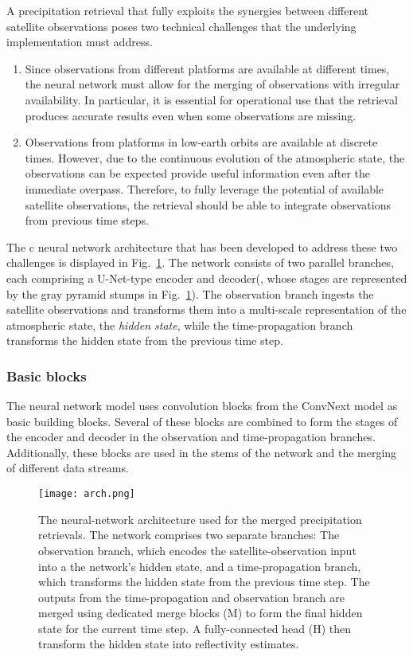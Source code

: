 \documentclass[11pt]{scrartcl}
\begin{document}
A precipitation retrieval that fully exploits the synergies between different
satellite observations poses two technical challenges that the underlying
implementation must address.
\begin{enumerate}
\item Since observations from different platforms are available at different
  times, the neural network must allow for the merging of observations with
  irregular availability. In particular, it is essential for operational use
  that the retrieval produces accurate results even when some observations are
  missing.

\item Observations from platforms in low-earth orbits are available at discrete
  times. However, due to the continuous evolution of the atmospheric state, the
  observations can be expected provide useful information even after the immediate
  overpass. Therefore, to fully leverage the potential of available satellite
  observations, the retrieval should be able to integrate observations from
  previous time steps.
\end{enumerate}


The c neural network architecture that has been developed to address these two
challenges is displayed in Fig.~\ref{fig:arch}. The network consists of two
parallel branches, each comprising a U-Net-type \citep{ronneberger15} encoder
and decoder(, whose stages are represented by the gray pyramid stumps in
Fig.~\ref{fig:arch}). The observation branch ingests the satellite observations
and transforms them into a multi-scale representation of the atmospheric state,
the \textit{hidden state}, while the time-propagation branch transforms the
hidden state from the previous time step.


\subsubsection{Basic blocks}

The neural network model uses convolution blocks from the ConvNext \citep{liu22}
model as basic building blocks. Several of these blocks are combined to form the
stages of the encoder and decoder in the observation and time-propagation
branches. Additionally, these blocks are used in the stems of the network and
the merging of different data streams.

\begin{figure}
\begin{center}
  \texttt{[image: arch.png]}
  \caption{
    The neural-network architecture used for the merged precipitation
    retrievals. The network comprises two separate branches: The observation
    branch, which encodes the satellite-observation input into a the network's
    hidden state, and a time-propagation branch, which transforms the
    hidden state from the previous time step. The outputs from the
    time-propagation and observation branch are merged using dedicated merge
    blocks (M) to form the final hidden state for the current time step. A
    fully-connected head (H) then transform the hidden state into reflectivity
    estimates.
  }
  \label{fig:arch}
\end{center}
\end{figure}
\end{document}
